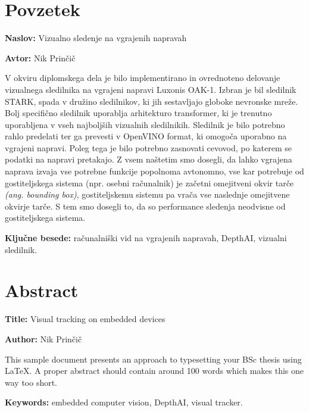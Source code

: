 \documentclass[a4paper,12pt,openright]{book}
\newcommand{\ttitle}{Vizualno sledenje na vgrajenih napravah}
\newcommand{\ttitleEn}{Visual tracking on embedded devices}
\newcommand{\tauthor}{Nik Prinčič}
\newcommand{\tkeywords}{računalniški vid na vgrajenih napravah, DepthAI, vizualni sledilnik}
\newcommand{\tkeywordsEn}{embedded computer vision, DepthAI, visual tracker}
\newcommand{\clearemptydoublepage}{\newpage{\pagestyle{empty}\cleardoublepage}}
\begin{document}
\clearemptydoublepage

\chapter*{Povzetek}

\noindent\textbf{Naslov:} \ttitle
\bigskip

\noindent\textbf{Avtor:} \tauthor
\bigskip

\noindent V okviru diplomskega dela je bilo implementirano in ovrednoteno delovanje vizualnega sledilnika na vgrajeni napravi Luxonis OAK-1. Izbran je bil sledilnik STARK, spada v družino sledilnikov, ki jih sestavljajo globoke nevronske mreže. Bolj specifično sledilnik uporablja arhitekturo transformer, ki je trenutno uporabljena v vseh najboljših vizualnih sledilnikih. Sledilnik je bilo potrebno rahlo predelati ter ga prevesti v OpenVINO format, ki omogoča uporabno na vgrajeni napravi. Poleg tega je bilo potrebno zasnovati cevovod, po katerem se podatki na napravi pretakajo. Z vsem naštetim smo dosegli, da lahko vgrajena naprava izvaja vse potrebne funkcije popolnoma avtonomno, vse kar potrebuje od gostiteljskega sistema (npr. osebni računalnik) je začetni omejitveni okvir tarče \emph{(ang. bounding box)}, gostiteljskemu sistemu pa vrača vse naslednje omejitvene okvirje tarče. S tem smo dosegli to, da so performance sledenja neodvisne od gostiteljskega sistema.
\bigskip

\noindent\textbf{Ključne besede:} \tkeywords.
\clearemptydoublepage

\chapter*{Abstract}

\noindent\textbf{Title:} \ttitleEn
\bigskip

\noindent\textbf{Author:} \tauthor
\bigskip

\noindent This sample document presents an approach to typesetting your BSc thesis using \LaTeX.
A proper abstract should contain around 100 words which makes this one way too short.
\bigskip

\noindent\textbf{Keywords:} \tkeywordsEn.
\clearemptydoublepage
\end{document}
